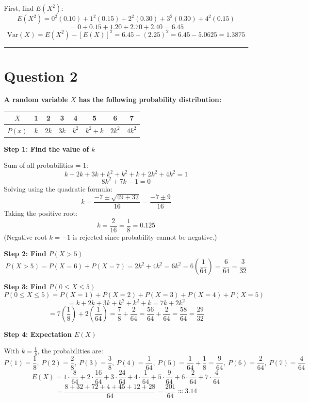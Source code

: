 \documentclass[12pt,a4paper]{article}
\begin{document}
First, find $E(X^2)$:
\[
E(X^2) = 0^2(0.10) + 1^2(0.15) + 2^2(0.30) + 3^2(0.30) + 4^2(0.15)
\]
\[
= 0 + 0.15 + 1.20 + 2.70 + 2.40 = 6.45
\]
\[
\text{Var}(X) = E(X^2) - [E(X)]^2 = 6.45 - (2.25)^2 = 6.45 - 5.0625 = \boxed{1.3875}
\]

\vspace{1em}\hrule\vspace{1em}

\section{Question 2}
\textbf{A random variable $X$ has the following probability distribution:}

\begin{center}
\begin{tabular}{|c|c|c|c|c|c|c|c|}
\hline
$X$ & 1 & 2 & 3 & 4 & 5 & 6 & 7 \\
\hline
$P(x)$ & $k$ & $2k$ & $3k$ & $k^2$ & $k^2+k$ & $2k^2$ & $4k^2$ \\
\hline
\end{tabular}
\end{center}

\textbf{Step 1: Find the value of $k$}

Sum of all probabilities = 1:
\[
k + 2k + 3k + k^2 + k^2 + k + 2k^2 + 4k^2 = 1
\]
\[
8k^2 + 7k - 1 = 0
\]
Solving using the quadratic formula:
\[
k = \frac{-7 \pm \sqrt{49 + 32}}{16} = \frac{-7 \pm 9}{16}
\]
Taking the positive root:
\[
k = \frac{2}{16} = \boxed{\frac{1}{8} = 0.125}
\]
(Negative root $k = -1$ is rejected since probability cannot be negative.)

\textbf{Step 2: Find $P(X > 5)$}
\[
P(X > 5) = P(X=6) + P(X=7) = 2k^2 + 4k^2 = 6k^2 = 6\left(\frac{1}{64}\right) = \frac{6}{64} = \boxed{\frac{3}{32}}
\]

\textbf{Step 3: Find $P(0 \leq X \leq 5)$}
\[
P(0 \leq X \leq 5) = P(X=1)+P(X=2)+P(X=3)+P(X=4)+P(X=5)
\]
\[
= k + 2k + 3k + k^2 + k^2 + k = 7k + 2k^2
\]
\[
= 7\left(\frac{1}{8}\right) + 2\left(\frac{1}{64}\right) = \frac{7}{8} + \frac{2}{64} = \frac{56}{64} + \frac{2}{64} = \frac{58}{64} = \boxed{\frac{29}{32}}
\]

\textbf{Step 4: Expectation $E(X)$}

With $k = \frac{1}{8}$, the probabilities are:
\[
P(1)=\frac{1}{8},\ P(2)=\frac{2}{8},\ P(3)=\frac{3}{8},\ P(4)=\frac{1}{64},\ P(5)=\frac{1}{64}+\frac{1}{8}=\frac{9}{64},\ P(6)=\frac{2}{64},\ P(7)=\frac{4}{64}
\]
\[
E(X) = 1\!\cdot\!\frac{8}{64}+2\!\cdot\!\frac{16}{64}+3\!\cdot\!\frac{24}{64}+4\!\cdot\!\frac{1}{64}+5\!\cdot\!\frac{9}{64}+6\!\cdot\!\frac{2}{64}+7\!\cdot\!\frac{4}{64}
\]
\[
= \frac{8+32+72+4+45+12+28}{64} = \frac{201}{64} \approx \boxed{3.14}
\]
\end{document}
